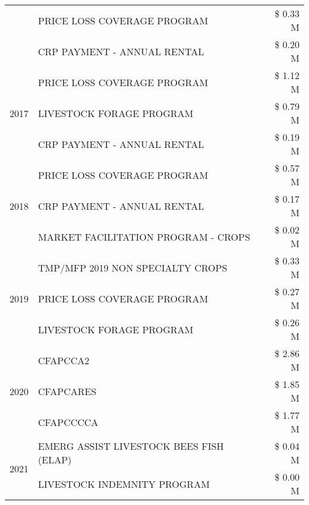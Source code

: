 \begin{tabular}{llr}
 & PRICE LOSS COVERAGE PROGRAM                   & \$ 0.33 M \\
 & CRP PAYMENT - ANNUAL RENTAL                   & \$ 0.20 M \\
\cline{1-3}
\multirow[t]{3}{*}{2017} & PRICE LOSS COVERAGE PROGRAM & \$ 1.12 M \\
 & LIVESTOCK FORAGE PROGRAM & \$ 0.79 M \\
 & CRP PAYMENT - ANNUAL RENTAL & \$ 0.19 M \\
\cline{1-3}
\multirow[t]{3}{*}{2018} & PRICE LOSS COVERAGE PROGRAM & \$ 0.57 M \\
 & CRP PAYMENT - ANNUAL RENTAL & \$ 0.17 M \\
 & MARKET FACILITATION PROGRAM - CROPS & \$ 0.02 M \\
\cline{1-3}
\multirow[t]{3}{*}{2019} & TMP/MFP 2019 NON SPECIALTY CROPS & \$ 0.33 M \\
 & PRICE LOSS COVERAGE PROGRAM & \$ 0.27 M \\
 & LIVESTOCK FORAGE PROGRAM & \$ 0.26 M \\
\cline{1-3}
\multirow[t]{3}{*}{2020} & CFAPCCA2 & \$ 2.86 M \\
 & CFAPCARES & \$ 1.85 M \\
 & CFAPCCCCA & \$ 1.77 M \\
\cline{1-3}
\multirow[t]{2}{*}{2021} & EMERG ASSIST LIVESTOCK BEES FISH (ELAP) & \$ 0.04 M \\
 & LIVESTOCK INDEMNITY PROGRAM & \$ 0.00 M \\
\cline{1-3}
\bottomrule
\end{tabular}
